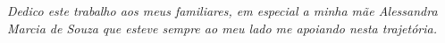 \documentclass[
	12pt,				%
	oneside,			%
	a4paper,			%
	english,			%
	brazil				%
	]{abntex2ppgsi}
\begin{document}
\begin{folhadeaprovacao}
\begin{center}





\end{center}
  
\end{folhadeaprovacao}

%
% 
\begin{dedicatoria}
  \vspace*{\fill}
  \centering
  \noindent
  \textit{Dedico este trabalho aos meus familiares, em especial a minha mãe Alessandra Marcia de Souza que esteve sempre ao meu lado me apoiando nesta trajetória.} 
	 \vspace*{\fill}
\end{dedicatoria}
\end{document}
